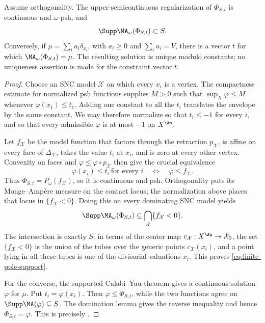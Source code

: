 \begin{proposition}
\label{prop:finite-pole-envelope}
Assume orthogonality.  The upper-semicontinuous regularization of
\(\Phi_{S,t}\) is continuous and \(\omega\)-psh, and
\begin{equation}
                         \Supp\MA_\omega(\Phi_{S,t})\subset S.
\label{eq:finite-pole-support}
\end{equation}
Conversely, if
\(\mu=\sum_i a_i\delta_{x_i}\), with \(a_i\geq0\) and
\(\sum_i a_i=V\), there is a vector \(t\) for which
\(\MA_\omega(\Phi_{S,t})=\mu\).  The resulting solution is unique modulo
constants; no uniqueness assertion is made for the constraint vector
\(t\).
\end{proposition}

\begin{proof}
Choose an SNC model \(\mathcal X\) on which every \(x_i\) is a vertex.
The compactness estimate for normalized psh functions supplies \(M>0\)
such that \(\sup_X\varphi\leq M\) whenever
\(\varphi(x_1)\leq t_1\).  Adding one constant to all the \(t_i\) translates
the envelope by the same constant.  We may therefore normalize so that
\(t_i\leq-1\) for every \(i\), and so that every admissible \(\varphi\) is
at most \(-1\) on \(X^{\An}\).

Let \(f_{\mathcal X}\) be the model function that factors through the
retraction \(p_{\mathcal X}\), is affine on every face of
\(\Delta_{\mathcal X}\), takes the value \(t_i\) at \(x_i\), and is zero
at every other vertex.  Convexity on faces and
\(\varphi\leq\varphi\circ p_{\mathcal X}\) then give the crucial
equivalence
\[
 \varphi(x_i)\leq t_i\ \text{for every }i
 \quad\Longleftrightarrow\quad
 \varphi\leq f_{\mathcal X}.
\]
Thus \(\Phi_{S,t}=P_\omega(f_{\mathcal X})\), so it is continuous and
psh.  Orthogonality puts its Monge--Amp\`ere measure on the contact locus;
the normalization above places that locus in \(\{f_{\mathcal X}<0\}\).
Doing this on every dominating SNC model yields
\[
 \Supp\MA_\omega(\Phi_{S,t})
 \subseteq\bigcap_{\mathcal X}\{f_{\mathcal X}<0\}.
\]
The intersection is exactly \(S\): in terms of the center map
\(c_{\mathcal X}:X^{\An}\to\mathcal X_0\), the set
\(\{f_{\mathcal X}<0\}\) is the union of the tubes over the generic points
\(c_{\mathcal X}(x_i)\), and a point lying in all these tubes is one of the
divisorial valuations \(x_i\).  This proves
\eqref{eq:finite-pole-support}.

For the converse, the supported Calabi--Yau theorem gives a continuous
solution \(\varphi\) for \(\mu\).  Put \(t_i=\varphi(x_i)\).  Then
\(\varphi\leq\Phi_{S,t}\), while the two functions agree on
\(\Supp\MA(\varphi)\subseteq S\).  The domination lemma gives the reverse
inequality and hence \(\Phi_{S,t}=\varphi\).  This is precisely
\cite[Lemma~8.5 and Proposition~8.6]{BFJ15}.
\end{proof}

